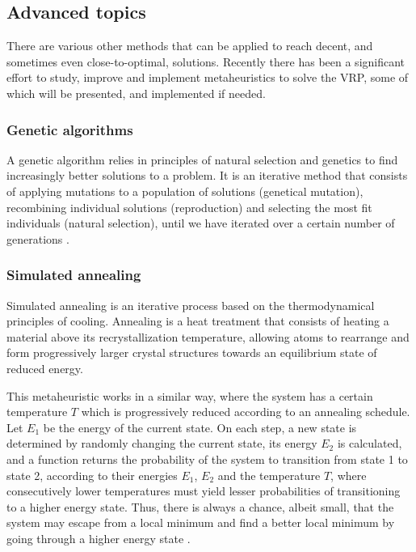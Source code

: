 \subsection{Advanced topics} \label{algorithm-vrp-advanced}
There are various other methods that can be applied to reach decent, and sometimes even close-to-optimal, solutions. Recently there has been a significant effort to study, improve and implement \glspl{metaheuristic} to solve the \acrshort*{VRP}, some of which will be presented, and implemented if needed.
\subsubsection{Genetic algorithms}
A genetic algorithm relies in principles of \gls{natural selection} and genetics to find increasingly better solutions to a problem. It is an \gls{iterative} method that consists of applying mutations to a population of solutions (genetical mutation), recombining individual solutions (reproduction) and selecting the most fit individuals (natural selection), until we have iterated over a certain number of generations \cite{intro-genetic-algs}.
\subsubsection{Simulated annealing}
Simulated annealing is an \gls{iterative} process based on the thermodynamical principles of cooling. Annealing is a heat treatment that consists of heating a material above its recrystallization temperature, allowing atoms to rearrange and form progressively larger crystal structures towards an equilibrium state of reduced energy.\par
This metaheuristic works in a similar way, where the system has a certain temperature $T$ which is progressively reduced according to an annealing schedule. Let $E_1$ be the energy of the current state. On each step, a new state is determined by randomly changing the current state, its energy $E_2$ is calculated, and a function returns the probability of the system to transition from state 1 to state 2, according to their energies $E_1$, $E_2$ and the temperature $T$, where consecutively lower temperatures must yield lesser probabilities of transitioning to a higher energy state. Thus, there is always a chance, albeit small, that the system may escape from a local minimum and find a better local minimum by going through a higher energy state \cite{numerical-recipes}.

